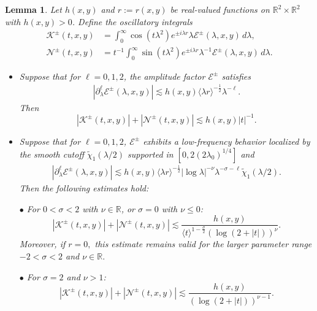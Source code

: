 \documentclass[reqno]{amsart}
\newtheorem{lemma}[theorem]{Lemma}
\numberwithin{equation}{section}
\begin{document}
\begin{lemma}\label{oscillatory}    Let \(h(x,y)\) and \(r:=r(x,y)\) be real-valued functions on \(\mathbb{R}^2 \times \mathbb{R}^2\) with \(h(x,y)>0\). Define the oscillatory integrals    
	\[
	\begin{aligned}
		\mathcal{K}^\pm(t,x,y) &= \int_0^{\infty} \cos (t \lambda^2)e^{\pm i\lambda r} \lambda \mathcal{E}^\pm(\lambda, x,y) \, d\lambda, \\
		\mathcal{N}^\pm(t,x,y) &= t^{-1}\int_0^{\infty} \sin(t\lambda^2) e^{\pm i\lambda r} \lambda^{-1} \mathcal{E}^\pm(\lambda, x,y) \, d\lambda.
	\end{aligned}
    \]  
	\begin{itemize}    
		\item[(i)] Suppose that for $\ell = 0, 1, 2$, the amplitude factor $\mathcal{E}^\pm$ satisfies    
		\begin{align}\label{condit 1}    
		\left| \partial_\lambda^{\ell} \mathcal{E}^\pm(\lambda, x,y) \right| \lesssim h(x, y) \langle \lambda r \rangle^{-\frac{1}{2}} \lambda^{-\ell}.    
		\end{align}    
		Then    
		\[    
		\left| \mathcal{K}^\pm(t,x,y) \right| + \left| \mathcal{N}^\pm(t,x,y) \right| \lesssim h(x, y) |t|^{-1}.    
		\]    
		
		\item[(ii)] Suppose that for $\ell = 0, 1, 2$, $\mathcal{E}^\pm$ exhibits a  low-frequency behavior localized by the smooth cutoff $\widetilde{\chi}_1(\lambda/2)$ supported in $[0, 2(2\lambda_0)^{1/4}]$ and    
		\begin{align}\label{condit 2}    
		\left| \partial_\lambda^{\ell} \mathcal{E}^\pm(\lambda, x,y) \right| \lesssim h(x, y) \langle \lambda r \rangle^{-\frac{1}{2}} |\log \lambda|^{-\nu} \lambda^{-\sigma - \ell} \widetilde{\chi}_1 (\lambda/2).    
		\end{align}    
		Then the following estimates hold:    
		
		$\bullet$ For $0 < \sigma < 2$ with $\nu \in \mathbb{R}$, or $\sigma = 0$ with $\nu \le 0$:    
		\[    
		\left| \mathcal{K}^\pm(t,x,y) \right| + \left| \mathcal{N}^\pm(t,x,y) \right| \lesssim \frac{h(x, y)}{\langle t \rangle^{1-\frac{\sigma}{2}} (\log(2+|t|))^{\nu}}.    
		\]    
Moreover, if $r=0,$  this estimate  remains
   valid for the larger parameter range
   $
   -2<\sigma<2$ and 
   $\nu\in\mathbb R.
   $		
		
        $\bullet$ For $\sigma = 2$ and $\nu > 1$:    
		\[    
		\left| \mathcal{K}^\pm(t,x,y) \right| + \left| \mathcal{N}^\pm(t,x,y) \right| \lesssim  \frac{h(x, y)}{\left(\log(2+|t|)\right)^{\nu-1}}.    
		\]    
	\end{itemize} 
\end{lemma}    
  
\end{document}
